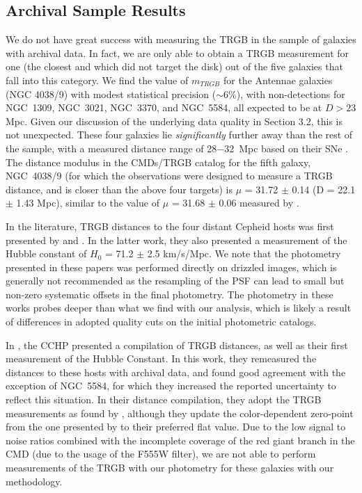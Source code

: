 \documentclass[twocolumn]{aastex62}
\begin{document}
\subsection{Archival Sample Results}

We do not have great success with measuring the TRGB in the sample of galaxies with archival data. In fact, we are only able to obtain a TRGB measurement for one (the closest and which did not target the disk) out of the five galaxies that fall into this category. We find the value of $m_{TRGB}$ for the Antennae galaxies (NGC 4038/9) with modest statistical precision ($\sim6\%$), with non-detections for NGC~1309, NGC~3021, NGC~3370, and NGC~5584, all expected to be at $D>23$ Mpc. Given our discussion of the underlying data quality in Section 3.2, this is not unexpected. These four galaxies lie \textit{significantly} further away than the rest of the sample, with a measured distance range of 28$-$32~Mpc based on their SNe \citep{2019ApJ...882...34F}. 
The distance modulus in the CMDs/TRGB catalog for the fifth galaxy, NGC~4038/9 (for which the observations were designed to measure a TRGB distance, and is closer than the above four targets) is $\mu$ = 31.72 $\pm$ 0.14 (D = 22.1 $\pm$  1.43 Mpc), similar to the value of $\mu$ = 31.68 $\pm$ 0.06 measured by \cite{2019ApJ...882...34F}.

In the literature, TRGB distances to the four distant Cepheid hosts was first presented by \cite{2015ApJ...807..133J} and \cite{2017ApJ...836...74J}. In the latter work, they also presented a measurement of the Hubble constant of $H_{0}$ = 71.2 $\pm$ 2.5 km/s/Mpc. We note that the photometry presented in these papers was performed directly on drizzled images, which is generally not recommended as the resampling of the PSF can lead to small but non-zero systematic offsets in the final photometry. The photometry in these works probes deeper than what we find with our analysis, which is likely a result of differences in adopted quality cuts on the initial photometric catalogs.

In \cite{2019ApJ...882...34F}, the CCHP presented a compilation of TRGB distances, as well as their first measurement of the Hubble Constant. In this work, they remeasured the distances to these hosts with archival data, and found good agreement with the exception of NGC~5584, for which they increased the reported uncertainty to reflect this situation. In their distance compilation, they adopt the TRGB measurements as found by \cite{2017ApJ...836...74J}, although they update the color-dependent zero-point from the one presented by \cite{2017ApJ...835...28J} to their preferred flat value. Due to the low signal to noise ratios combined with the incomplete coverage of the red giant branch in the CMD (due to the usage of the F555W filter), we are not able to perform measurements of the TRGB with our photometry for these galaxies with our methodology.
\end{document}
